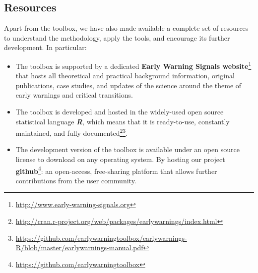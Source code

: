 \documentclass[12pt,a4paper,final]{article}
\begin{document}
\begin{doublespacing}
\subsection{Resources} 

\label{sec:resources}
Apart from the toolbox, we have also made available a complete set of resources to understand the methodology, apply the tools, and encourage its further development. In particular:
\begin{itemize}
\item The toolbox is supported by a dedicated \textbf{Early Warning Signals website}\footnote{\url{http://www.early-warning-signals.org}} that hosts all theoretical and practical background information, original publications, case studies, and updates of the science around the theme of early warnings and critical transitions. 
\item The toolbox is developed and hosted in the widely-used open source statistical language \textbf{\textit{R}}, which means that it is ready-to-use, constantly maintained, and fully documented\footnote{\url{http://cran.r-project.org/web/packages/earlywarnings/index.html}}\footnote{\url{https://github.com/earlywarningtoolbox/earlywarnings-R/blob/master/earlywarnings-manual.pdf}}.
 \item The development version of the toolbox is available under an open source license to download on any operating system. By hosting our project \textbf{github}\footnote{\url{https://github.com/earlywarningtoolbox}}: an open-access, free-sharing platform that allows further contributions from the user community.
 \end{itemize}



\end{doublespacing}
\end{document}
